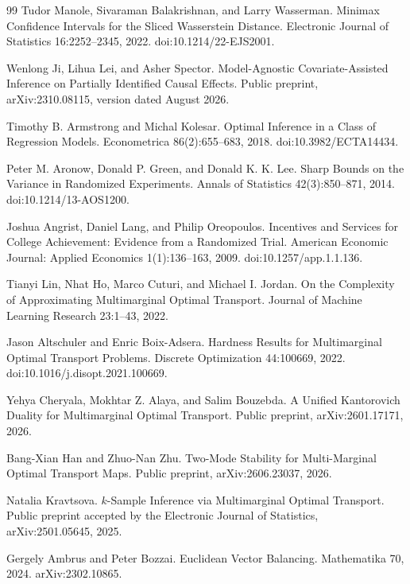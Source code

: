 \documentclass{article}
\begin{document}
\begin{thebibliography}{99}
   Tudor Manole, Sivaraman Balakrishnan, and Larry Wasserman. Minimax Confidence Intervals for the Sliced Wasserstein Distance. Electronic Journal of Statistics 16:2252--2345, 2022. doi:10.1214/22-EJS2001.

   Wenlong Ji, Lihua Lei, and Asher Spector. Model-Agnostic Covariate-Assisted Inference on Partially Identified Causal Effects. Public preprint, arXiv:2310.08115, version dated August 2026.

   Timothy B. Armstrong and Michal Kolesar. Optimal Inference in a Class of Regression Models. Econometrica 86(2):655--683, 2018. doi:10.3982/ECTA14434.

   Peter M. Aronow, Donald P. Green, and Donald K. K. Lee. Sharp Bounds on the Variance in Randomized Experiments. Annals of Statistics 42(3):850--871, 2014. doi:10.1214/13-AOS1200.

   Joshua Angrist, Daniel Lang, and Philip Oreopoulos. Incentives and Services for College Achievement: Evidence from a Randomized Trial. American Economic Journal: Applied Economics 1(1):136--163, 2009. doi:10.1257/app.1.1.136.

   Tianyi Lin, Nhat Ho, Marco Cuturi, and Michael I. Jordan. On the Complexity of Approximating Multimarginal Optimal Transport. Journal of Machine Learning Research 23:1--43, 2022.

   Jason Altschuler and Enric Boix-Adsera. Hardness Results for Multimarginal Optimal Transport Problems. Discrete Optimization 44:100669, 2022. doi:10.1016/j.disopt.2021.100669.

   Yehya Cheryala, Mokhtar Z. Alaya, and Salim Bouzebda. A Unified Kantorovich Duality for Multimarginal Optimal Transport. Public preprint, arXiv:2601.17171, 2026.

   Bang-Xian Han and Zhuo-Nan Zhu. Two-Mode Stability for Multi-Marginal Optimal Transport Maps. Public preprint, arXiv:2606.23037, 2026.

   Natalia Kravtsova. \(k\)-Sample Inference via Multimarginal Optimal Transport. Public preprint accepted by the Electronic Journal of Statistics, arXiv:2501.05645, 2025.

   Gergely Ambrus and Peter Bozzai. Euclidean Vector Balancing. Mathematika 70, 2024. arXiv:2302.10865.


\end{thebibliography}
\end{document}
